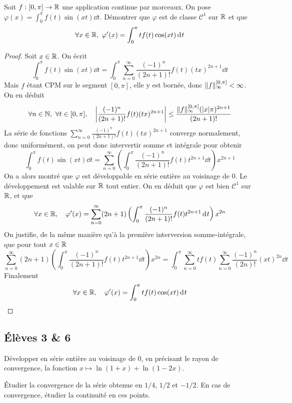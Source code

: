 \documentclass[10pt]{scrartcl}
\begin{document}
    \begin{exo}
        Soit $f:[0,\pi]\to\operatorname{\mathbb R}$ une application continue par morceaux. 
        On pose $\varphi(x)=\int_0^\pi f(t)\sin(xt)\dd t$. 
        Démontrer que $\varphi$ est de classe $\mathcal C^1$ sur $\operatorname{\mathbb R}$ et que 
        \[
            \forall x\in \operatorname{\mathbb R},\ \varphi'(x)=\int_0^\pi tf(t)\cos(xt)\operatorname{d\hskip-1pt} t
        \]
    \end{exo}


    \begin{proof}
        Soit $x\in\operatorname{\mathbb R}$. 
        On écrit 
        \[
            \int_0^\pi f(t)\sin(xt)\dd t = \int_0^\pi\sum_{n=0}^\infty \frac{(-1)^n}{(2n+1)!}f(t)(tx)^{2n+1}\dd t
        \]
        Mais $f$ étant CPM sur le segment $[0,\pi]$, elle y est bornée, donc $\lVert f\rVert_\infty^{[0,\pi]}<\infty$.
        On en déduit 
        \[
            \forall n\in\operatorname{\mathbb N},\ \forall t\in[0,\pi],\quad \left|\frac{(-1)^n}{(2n+1)!}f(t)(tx)^{2n+1}\right|\leq\frac{\lVert f\rVert_\infty^{[0,\pi]}(|x|\pi)^{2n+1}}{(2n+1)!}
        \]
        La série de fonctions $\sum_{n=0}^\infty \frac{(-1)^n}{(2n+1)!}f(t)(tx)^{2n+1}$ converge normalement, donc uniformément, 
        on peut donc intervertir somme et intégrale pour obtenir 
        \[
            \int_0^\pi f(t)\sin(xt)\dd t = \sum_{n=0}^\infty \left(\int_0^\pi \frac{(-1)^n}{(2n+1)!}f(t)t^{2n+1}\dd t\right)x^{2n+1}
        \]
        On a alors montré que $\varphi$ est développable en série entière au voisinage de $0$.
        Le développement est valable sur $\operatorname{\mathbb R}$ tout entier. 
        On en déduit que $\varphi$ est bien $\mathcal C^1$ sur $\operatorname{\mathbb R}$, et que 
        \[
            \forall x\in\operatorname{\mathbb R},\quad \varphi'(x) = \sum_{n=0}^\infty (2n+1)\left(\int_0^\pi \frac{(-1)^n}{(2n+1)!}f(t)t^{2n+1}\operatorname{d\hskip-1pt} t\right)x^{2n}
        \]
        On justifie, de la même manière qu'à la première interversion somme-intégrale, que pour tout $x\in\operatorname{\mathbb R}$
        \[
            \sum_{n=0}^\infty (2n+1)\left(\int_0^\pi \frac{(-1)^n}{(2n+1)!}f(t)t^{2n+1}\dd t\right)x^{2n} = \int_0^\pi\sum_{n=0}^\infty tf(t)\sum_{n=0}^\infty\frac{(-1)^n}{(2n)!}(xt)^{2n}\dd t 
        \]
        Finalement 
        \[
            \forall x\in\operatorname{\mathbb R},\quad \varphi'(x) = \int_0^\pi tf(t)\cos(xt)\operatorname{d\hskip-1pt} t
        \]
    \end{proof}

    \subsection*{Élèves 3 \& 6}
    \begin{ccp}
        Développer en série entière au voisinage de $0$, en précisant le rayon de convergence, la fonction $x\mapsto \ln(1+x)+\ln(1-2x)$.
    
        Étudier la convergence de la série obtenue en $1/4$, $1/2$ et $-1/2$.
        En cas de convergence, étudier la continuité en ces points.
    \end{ccp}
\end{document}
